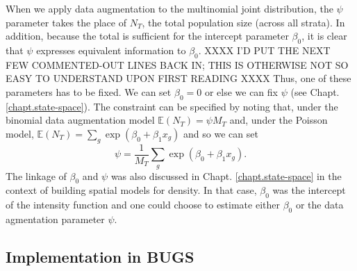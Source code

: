 When we apply data augmentation to the multinomial joint distribution,
the $\psi$ parameter takes the place of $N_{T}$, the total population
size (across all strata). In addition, 
 because the total is sufficient
for the intercept parameter $\beta_{0}$, it is clear that $\psi$
expresses equivalent information to $\beta_{0}$.
XXXX I'D PUT THE NEXT FEW COMMENTED-OUT LINES BACK IN; THIS IS OTHERWISE NOT SO EASY TO UNDERSTAND UPON FIRST READING XXXX
Thus, one of these parameters has to be fixed. We can set $\beta_0 = 0$ or
else we can fix $\psi$ (see Chapt. \ref{chapt.state-space}).  The
constraint can be specified by noting that, under the binomial data
augmentation model $\mathbb{E}(N_{T}) = \psi M_{T}$ and, under the
Poisson model, $\mathbb{E}(N_{T}) = \sum_{g} \exp(\beta_{0} +
\beta_{1} x_{g})$ and so we can set
\[
 \psi = \frac{1}{M_{T}} \sum_{g} \exp(\beta_{0} + \beta_{1} x_{g}).
\]
The linkage of $\beta_{0}$ and $\psi$ was also discussed in
Chapt. \ref{chapt.state-space} in the context of building spatial
models for density. In that case, $\beta_0$ was the intercept of the
intensity function and one could choose to estimate either $\beta_0$
or the data agmentation parameter $\psi$.

\subsection{Implementation in BUGS}

